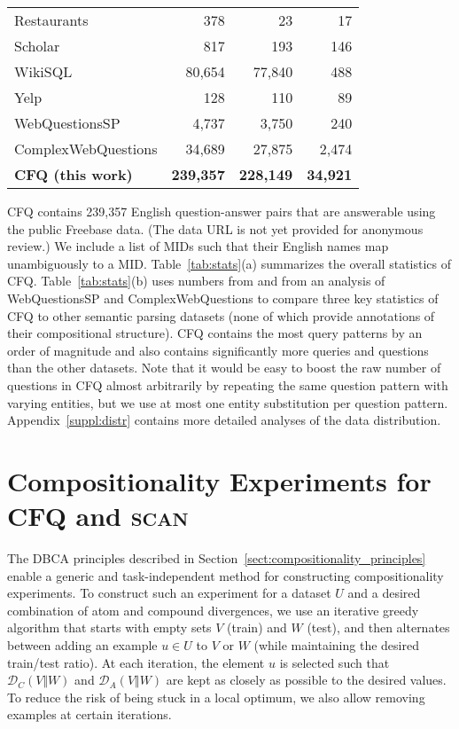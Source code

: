 \documentclass[letterpaper]{article}
\newcommand{\SCAN}{\textsc{scan}}
\begin{document}
\begin{table}[tb]
\begin{minipage}[t][][b]{0.495\textwidth}
{\begin{tabular}{@{}lrrr@{}}
        Restaurants & 378 & 23 & 17 \\
        Scholar & 817 & 193 & 146 \\
        WikiSQL & 80,654 & 77,840 & 488 \\
        Yelp & 128 & 110 & 89 \\
        \hline
        WebQuestionsSP & 4,737 & 3,750 & 240 \\ 
        ComplexWebQuestions & 34,689 & 27,875 & 2,474 \\
        \textbf{CFQ (this work)} & \textbf{239,357} & \textbf{228,149} & \textbf{34,921} \\
        \hline
    \end{tabular}}
    \end{minipage}
\end{table}
CFQ contains 239,357 English question-answer pairs that are answerable using the public Freebase data. (The data URL is not yet provided for anonymous review.)
We include a list of MIDs such that their English names map unambiguously to a MID.
Table~\ref{tab:stats}(a) summarizes the overall statistics of CFQ.
Table~\ref{tab:stats}(b) uses numbers from \citep{ACL2018sql} and from an analysis of WebQuestionsSP \citep{yih2016webqsp} and ComplexWebQuestions \citep{talmor18compwebq} to compare three key statistics of CFQ to other semantic parsing datasets (none of which provide annotations of their compositional structure). CFQ contains the most query patterns by an order of magnitude and also contains significantly more queries and questions than the other datasets.
Note that it would be easy to boost the raw number of questions in CFQ almost arbitrarily by repeating the same question pattern with varying entities, but we use at most one entity substitution per question pattern.
Appendix~\ref{suppl:distr} contains more detailed analyses of the data distribution.

\section{Compositionality Experiments for CFQ and \SCAN{}}
\label{sect:measuring-comp-gen}


The DBCA principles described in Section~\ref{sect:compositionality_principles} enable a generic and task-independent method for constructing compositionality experiments.
To construct such an experiment for a dataset $U$ and a desired combination of atom and compound divergences, we use an iterative greedy algorithm that starts with empty sets $V$ (train) and $W$ (test), and then alternates between adding an example $u \in U$ to $V$ or $W$ (while maintaining the desired train/test ratio). At each iteration, the element $u$ is selected such that $\mathcal{D}_C(V \Vert W)$ and $\mathcal{D}_A(V \Vert W)$ are kept as closely as possible to the desired values. To reduce the risk of being stuck in a local optimum, we also allow removing examples at certain iterations.
\end{document}
